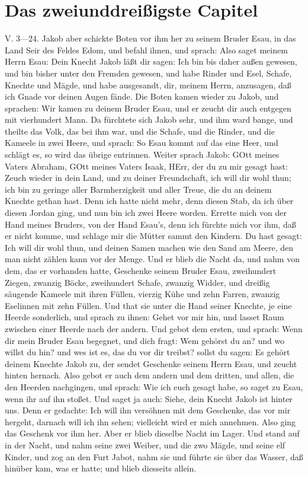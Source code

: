 \section{Das zweiunddreißigste Capitel}
\begin{schriftzitat}
V. 3—24. Jakob aber schickte Boten vor ihm her zu seinem Bruder Esau, in das Land Seir des Feldes Edom, und befahl ihnen, und sprach: Also saget meinem Herrn Esau: Dein Knecht Jakob läßt dir sagen: Ich bin bis daher außen gewesen, und bin bisher unter den Fremden gewesen, und habe Rinder und Esel, Schafe, Knechte und Mägde, und habe ausgesandt, dir, meinem Herrn, anzusagen, daß ich Gnade vor deinen Augen fände. Die Boten kamen wieder zu Jakob, und sprachen: Wir kamen zu deinem Bruder Esau, und er zeucht dir auch entgegen mit vierhundert Mann. Da fürchtete sich Jakob sehr, und ihm ward bange, und theilte das Volk, das bei ihm war, und die Schafe, und die Rinder, und die Kameele in zwei Heere, und sprach: So Esau kommt auf das eine Heer, und schlägt es, so wird das übrige entrinnen. Weiter sprach Jakob: GOtt meines Vaters Abraham, GOtt meines Vaters Isaak, HErr, der du zu mir gesagt hast: Zeuch wieder in dein Land, und zu deiner Freundschaft, ich will dir wohl thun; ich bin zu geringe aller Barmherzigkeit und aller Treue, die du an deinem Knechte gethan hast. Denn ich hatte nicht mehr, denn diesen Stab, da ich über diesen Jordan ging, und nun bin ich zwei Heere worden. Errette mich von der Hand meines Bruders, von der Hand Esau's, denn ich fürchte mich vor ihm, daß er nicht komme, und schlage mir die Mütter sammt den Kindern. Du hast gesagt: Ich will dir wohl thun, und deinen Samen machen wie den Sand am Meere, den man nicht zählen kann vor der Menge. Und er blieb die Nacht da, und nahm von dem, das er vorhanden hatte, Geschenke seinem Bruder Esau, zweihundert Ziegen, zwanzig Böcke, zweihundert Schafe, zwanzig Widder, und dreißig säugende Kameele mit ihren Füllen, vierzig Kühe und zehn Farren, zwanzig Eselinnen mit zehn Füllen. Und that sie unter die Hand seiner Knechte, je eine Heerde sonderlich, und sprach zu ihnen: Gehet vor mir hin, und lasset Raum zwischen einer Heerde nach der andern. Und gebot dem ersten, und sprach: Wenn dir mein Bruder Esau begegnet, und dich fragt: Wem gehörst du an? und wo willst du hin? und wes ist es, das du vor dir treibst? sollst du sagen: Es gehört deinem Knechte Jakob zu, der sendet Geschenke seinem Herrn Esau, und zeucht hinten hernach. Also gebot er auch dem andern und dem dritten, und allen, die den Heerden nachgingen, und sprach: Wie ich euch gesagt habe, so saget zu Esau, wenn ihr auf ihn stoßet. Und saget ja auch: Siehe, dein Knecht Jakob ist hinter uns. Denn er gedachte: Ich will ihn versöhnen mit dem Geschenke, das vor mir hergeht, darnach will ich ihn sehen; vielleicht wird er mich annehmen. Also ging das Geschenk vor ihm her. Aber er blieb dieselbe Nacht im Lager. Und stand auf in der Nacht, und nahm seine zwei Weiber, und die zwo Mägde, und seine elf Kinder, und zog an den Furt Jabot, nahm sie und führte sie über das Wasser, daß hinüber kam, was er hatte; und blieb diesseits allein.
\end{schriftzitat}

